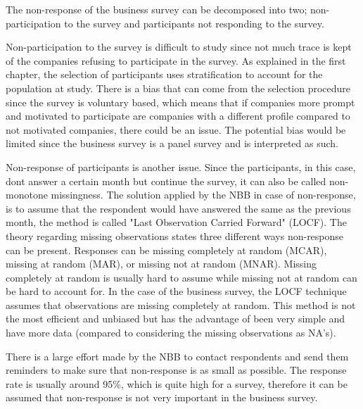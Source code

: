 \documentclass[12pt,a4paper,oneside]{book}
\begin{document}

The non-response of the business survey can be decomposed into two; non-participation to the survey and participants not responding to the survey.

Non-participation to the survey is difficult to study since not much trace is kept of the companies refusing to participate in the survey. As explained in the first chapter, the selection of participants uses stratification to account for the population at study. 
There is a bias that can come from the selection procedure since the survey is voluntary based, which means that if companies more prompt and motivated to participate are companies with a different profile compared to not motivated companies, there could be an issue.
The potential bias would be limited since the business survey is a panel survey and is interpreted as such.

Non-response of participants is another issue. 
Since the participants, in this case, dont answer a certain month but continue the survey, it can also be called non-monotone missingness.
The solution applied by the NBB in case of non-response, is to assume that the respondent would have answered the same as the previous month, the method is called "Last Observation Carried Forward" (LOCF). 
The theory regarding missing observations states three different ways non-response can be present. Responses can be missing completely at random (MCAR), missing at random (MAR), or missing not at random (MNAR). Missing completely at random is usually hard to assume while missing not at random can be hard to account for.
In the case of the business survey, the LOCF technique assumes that observations are missing completely at random. This method is not the most efficient and unbiased but has the advantage of been very simple and have more data (compared to considering the missing observations as NA's). 

There is a large effort made by the NBB to contact respondents and send them reminders to make sure that non-response is as small as possible.
The response rate is usually around 95\%, which is quite high for a survey, therefore it can be assumed that non-response is not very important in the business survey.

\end{document}
